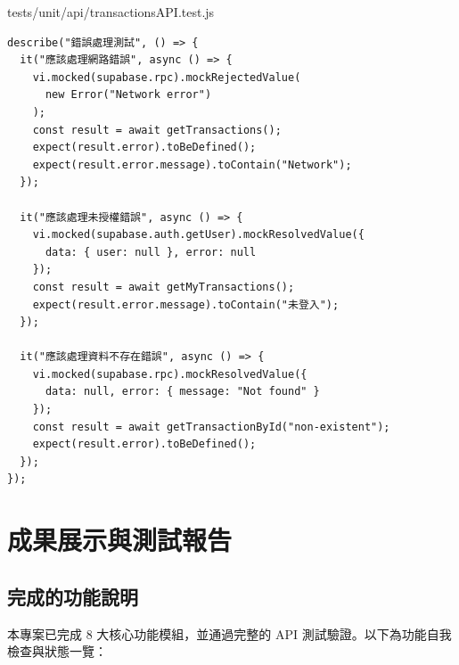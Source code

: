 \documentclass[11pt, a4paper]{article}
\begin{document}
\begin{codebox}{tests/unit/api/transactionsAPI.test.js}
  \begin{lstlisting}
describe("錯誤處理測試", () => {
  it("應該處理網路錯誤", async () => {
    vi.mocked(supabase.rpc).mockRejectedValue(
      new Error("Network error")
    );
    const result = await getTransactions();
    expect(result.error).toBeDefined();
    expect(result.error.message).toContain("Network");
  });

  it("應該處理未授權錯誤", async () => {
    vi.mocked(supabase.auth.getUser).mockResolvedValue({
      data: { user: null }, error: null
    });
    const result = await getMyTransactions();
    expect(result.error.message).toContain("未登入");
  });

  it("應該處理資料不存在錯誤", async () => {
    vi.mocked(supabase.rpc).mockResolvedValue({
      data: null, error: { message: "Not found" }
    });
    const result = await getTransactionById("non-existent");
    expect(result.error).toBeDefined();
  });
});
\end{lstlisting}
\end{codebox}


\newpage
\section{成果展示與測試報告}

\subsection{完成的功能說明}
本專案已完成 8 大核心功能模組，並通過完整的 API 測試驗證。以下為功能自我檢查與狀態一覽：
\end{document}
